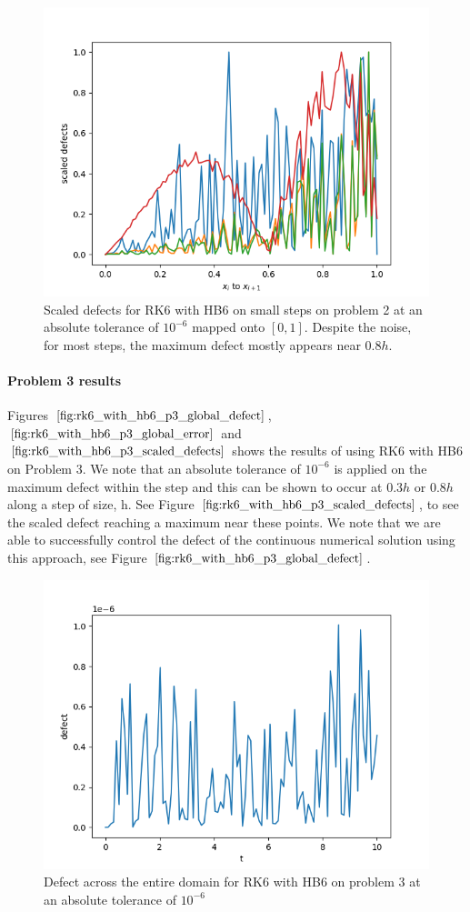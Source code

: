 \begin{figure}[H]
\centering
\includegraphics[width=0.7\linewidth]{./figures/rk6_with_hb6_p2_scaled_defects_small_steps}
\caption{Scaled defects for RK6 with HB6 on small steps on problem 2 at an absolute tolerance of $10^{-6}$ mapped onto $[0, 1]$. Despite the noise, for most steps, the maximum defect mostly appears near $0.8h$.}
\label{fig:rk6_with_hb6_p2_scaled_defects_small_steps}
\end{figure}

\paragraph{Problem 3 results}
Figures $\ref{fig:rk6_with_hb6_p3_global_defect}$, $\ref{fig:rk6_with_hb6_p3_global_error}$ and $\ref{fig:rk6_with_hb6_p3_scaled_defects}$ shows the results of using RK6 with HB6 on Problem 3. 
We note that an absolute tolerance of $10^{-6}$ is applied on the maximum defect within the step and this can be shown to occur at $0.3h$ or $0.8h$ along a step of size, h. See Figure $\ref{fig:rk6_with_hb6_p3_scaled_defects}$, to see the scaled defect reaching a maximum near these points. We note that we are able to successfully control the defect of the continuous numerical solution using this approach, see Figure $\ref{fig:rk6_with_hb6_p3_global_defect}$. 

\begin{figure}[H]
\centering
\includegraphics[width=0.7\linewidth]{./figures/rk6_with_hb6_p3_global_defect}
\caption{Defect across the entire domain for RK6 with HB6 on problem 3 at an absolute tolerance of $10^{-6}$}
\label{fig:rk6_with_hb6_p3_global_defect}
\end{figure}

